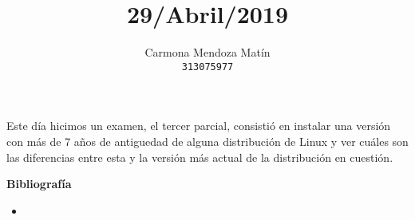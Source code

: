 \documentclass[11pt, a4paper]{report}
\begin{document}
\title{29/Abril/2019}
\author{
  Carmona Mendoza Mat\'in\\
  \texttt{313075977}
}
\date{}
\maketitle

Este día hicimos un examen, el tercer parcial, consistió en instalar una
versión con más de 7 años de antiguedad de alguna distribución de Linux y ver
cuáles son las diferencias entre esta y la versión más actual de la
distribución en cuestión.

\newpage

\textbf{Bibliografía} \\

\begin{itemize}

\item \url{}


\end{itemize}
\end{document}
